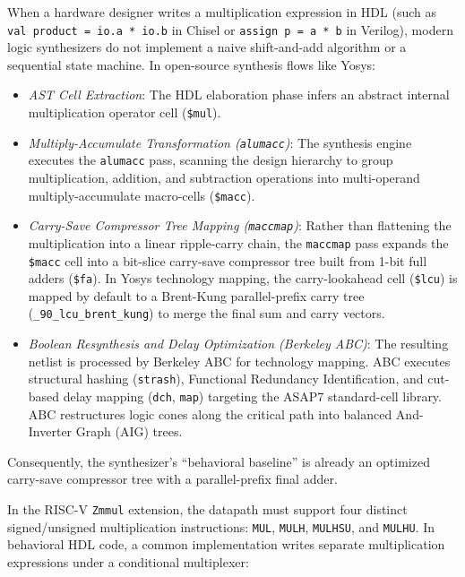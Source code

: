 When a hardware designer writes a multiplication expression in HDL (such as \texttt{val product = io.a * io.b} in Chisel or \texttt{assign p = a * b} in Verilog), modern logic synthesizers do not implement a naive shift-and-add algorithm or a sequential state machine. In open-source synthesis flows like Yosys:
\begin{itemize}
    \item \textit{AST Cell Extraction}: The HDL elaboration phase infers an abstract internal multiplication operator cell (\texttt{\$mul}).
    
    \item \textit{Multiply-Accumulate Transformation (\texttt{alumacc})}: The synthesis engine executes the \texttt{alumacc} pass, scanning the design hierarchy to group multiplication, addition, and subtraction operations into multi-operand multiply-accumulate macro-cells (\texttt{\$macc}).
    
    \item \textit{Carry-Save Compressor Tree Mapping (\texttt{maccmap})}: Rather than flattening the multiplication into a linear ripple-carry chain, the \texttt{maccmap} pass expands the \texttt{\$macc} cell into a bit-slice carry-save compressor tree built from 1-bit full adders (\texttt{\$fa}). In Yosys technology mapping, the carry-lookahead cell (\texttt{\$lcu}) is mapped by default to a Brent-Kung parallel-prefix carry tree (\texttt{\_90\_lcu\_brent\_kung}) to merge the final sum and carry vectors.
    
    \item \textit{Boolean Resynthesis and Delay Optimization (Berkeley ABC)}: The resulting netlist is processed by Berkeley ABC for technology mapping. ABC executes structural hashing (\texttt{strash}), Functional Redundancy Identification, and cut-based delay mapping (\texttt{dch}, \texttt{map}) targeting the ASAP7 standard-cell library. ABC restructures logic cones along the critical path into balanced And-Inverter Graph (AIG) trees.
\end{itemize}

Consequently, the synthesizer's ``behavioral baseline'' is already an optimized carry-save compressor tree with a parallel-prefix final adder. 

In the RISC-V \texttt{Zmmul} extension, the datapath must support four distinct signed/unsigned multiplication instructions: \texttt{MUL}, \texttt{MULH}, \texttt{MULHSU}, and \texttt{MULHU}. In behavioral HDL code, a common implementation writes separate multiplication expressions under a conditional multiplexer:

